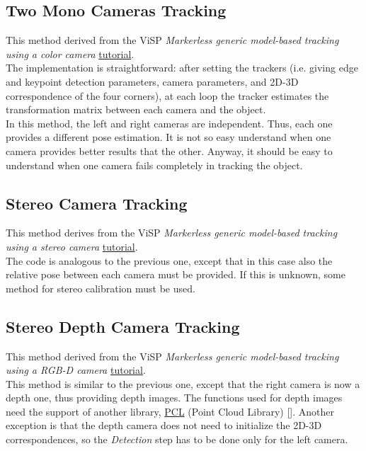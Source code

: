 \subsection{Two Mono Cameras Tracking}
\label{subsec:monoTrack}
This method derived from the ViSP \textit{Markerless generic model-based tracking using a color camera} \href{https://visp-doc.inria.fr/doxygen/visp-daily/tutorial-tracking-mb-generic.html}{tutorial}.\\
The implementation is straightforward: after setting the trackers (i.e. giving edge and keypoint detection parameters, camera parameters, and 2D-3D correspondence of the four corners), at each loop the tracker estimates the transformation matrix between each camera and the object.\\
In this method, the left and right cameras are independent. Thus, each one provides a different pose estimation. It is not so easy understand when one camera provides better results that the other. Anyway, it should be easy to understand when one camera fails completely in tracking the object.

\subsection{Stereo Camera Tracking}
\label{subsec:stereoTrack}
This method derives from the ViSP \textit{Markerless generic model-based tracking using a stereo camera} \href{https://visp-doc.inria.fr/doxygen/visp-daily/tutorial-tracking-mb-generic-stereo.html}{tutorial}.\\
The code is analogous to the previous one, except that in this case also the relative pose between each camera must be provided. If this is unknown, some method for stereo calibration must be used.

\subsection{Stereo Depth Camera Tracking}
\label{subsec:depthTrack}
This method derived from the ViSP \textit{Markerless generic model-based tracking using a RGB-D camera} \href{https://visp-doc.inria.fr/doxygen/visp-daily/tutorial-tracking-mb-generic-rgbd.html}{tutorial}.\\
This method is similar to the previous one, except that the right camera is now a depth one, thus providing depth images. The functions used for depth images need the support of another library, \href{http://www.pointclouds.org/}{PCL} (Point Cloud Library) [\cite{pclLib}]. Another exception is that the depth camera does not need to initialize the 2D-3D correspondences, so the \textit{Detection} step has to be done only for the left camera.

